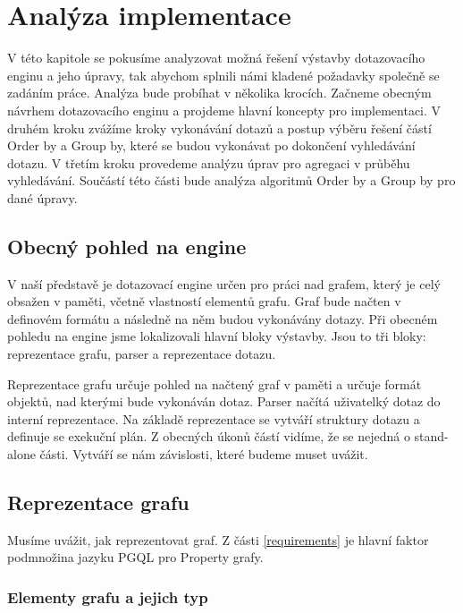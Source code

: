 

\chapter{Analýza implementace}

V této kapitole se pokusíme analyzovat možná řešení výstavby dotazovacího enginu a jeho úpravy, tak abychom splnili námi kladené požadavky společně se zadáním práce.
Analýza bude probíhat v několika krocích.
Začneme obecným návrhem dotazovacího enginu a projdeme hlavní koncepty pro implementaci.
V druhém kroku zvážíme kroky vykonávání dotazů a postup výběru řešení částí Order by a Group by, které se budou vykonávat po dokončení vyhledávání dotazu.
V třetím kroku provedeme analýzu úprav pro agregaci v průběhu vyhledávání. 
Součástí této části bude analýza algoritmů Order by a Group by pro dané úpravy. 

\section{Obecný pohled na engine}

V naší představě je dotazovací engine určen pro práci nad grafem, který je celý obsažen v paměti, včetně vlastností elementů grafu.
Graf bude načten v definovém formátu a následně na něm budou vykonávány dotazy. 
Při obecném pohledu na engine jsme lokalizovali hlavní bloky výstavby.
Jsou to tři bloky: reprezentace grafu, parser a reprezentace dotazu.

Reprezentace grafu určuje pohled na načtený graf v paměti a určuje formát objektů, nad kterými bude vykonáván dotaz.
Parser načítá uživatelký dotaz do interní reprezentace. 
Na základě reprezentace se vytváří struktury dotazu a definuje se exekuční plán. 
Z obecných úkonů částí vidíme, že se nejedná o stand-alone části.
Vytváří se nám závislosti, které budeme muset uvážit.

\section{Reprezentace grafu}

Musíme uvážit, jak reprezentovat graf.
Z části \ref{requirements} je hlavní faktor podmnožina jazyku PGQL pro Property grafy.

\subsection{Elementy grafu a jejich typ}


